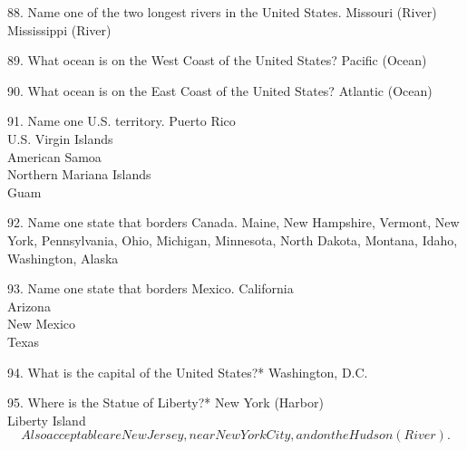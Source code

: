 \documentclass[avery5371,frame]{flashcards}
\begin{document}
        \begin{flashcard}{88. Name one of the two longest rivers in the United States.}
        {Missouri (River)\\Mississippi (River)}
        \end{flashcard}
        \begin{flashcard}{89. What ocean is on the West Coast of the United States?}
        {Pacific (Ocean)}
        \end{flashcard}
        \begin{flashcard}{90. What ocean is on the East Coast of the United States?}
        {Atlantic (Ocean)}
        \end{flashcard}
        \begin{flashcard}{91. Name one U.S. territory.}
        {Puerto Rico\\U.S. Virgin Islands\\American Samoa\\Northern Mariana Islands\\Guam}
        \end{flashcard}
        \begin{flashcard}{92. Name one state that borders Canada.}
        {Maine\footnotesize, New Hampshire\footnotesize, Vermont\footnotesize, New York\footnotesize, Pennsylvania\footnotesize, Ohio\footnotesize, Michigan\footnotesize, Minnesota\footnotesize, North Dakota\footnotesize, Montana\footnotesize, Idaho\footnotesize, Washington\footnotesize, Alaska}
        \end{flashcard}
        \begin{flashcard}{93. Name one state that borders Mexico.}
        {California\\Arizona\\New Mexico\\Texas}
        \end{flashcard}
        \begin{flashcard}{94. What is the capital of the United States?*}
        {Washington, D.C.}
        \end{flashcard}
        \begin{flashcard}{95. Where is the Statue of Liberty?*}
        {New York (Harbor)\\Liberty Island\\\[Also acceptable are New Jersey, near New York City, and on the Hudson (River).\]}
        \end{flashcard}
\end{document}
